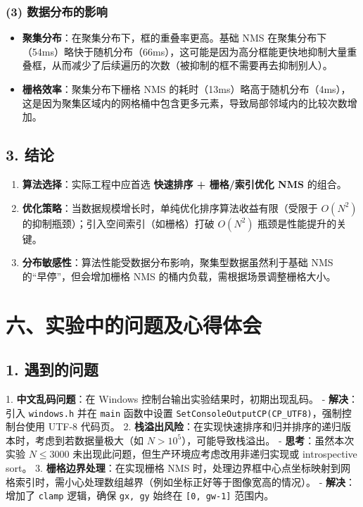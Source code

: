 \documentclass[a4paper,12pt]{ctexart}
\begin{document}
\subsubsection{(3) 数据分布的影响}
\begin{itemize}
    \item \textbf{聚集分布}：在聚集分布下，框的重叠率更高。基础 NMS 在聚集分布下（54ms）略快于随机分布（66ms），这可能是因为高分框能更快地抑制大量重叠框，从而减少了后续遍历的次数（被抑制的框不需要再去抑制别人）。
    \item \textbf{栅格效率}：聚集分布下栅格 NMS 的耗时（13ms）略高于随机分布（4ms），这是因为聚集区域内的网格桶中包含更多元素，导致局部邻域内的比较次数增加。
\end{itemize}

\subsection{3. 结论}
\begin{enumerate}
    \item \textbf{算法选择}：实际工程中应首选 \textbf{快速排序 + 栅格/索引优化 NMS} 的组合。
    \item \textbf{优化策略}：当数据规模增长时，单纯优化排序算法收益有限（受限于 $O(N^2)$ 的抑制瓶颈）；引入空间索引（如栅格）打破 $O(N^2)$ 瓶颈是性能提升的关键。
    \item \textbf{分布敏感性}：算法性能受数据分布影响，聚集型数据虽然利于基础 NMS 的“早停”，但会增加栅格 NMS 的桶内负载，需根据场景调整栅格大小。
\end{enumerate}

\section*{六、实验中的问题及心得体会}

\subsection{1. 遇到的问题}
1. \textbf{中文乱码问题}：在 Windows 控制台输出实验结果时，初期出现乱码。
   - \textbf{解决}：引入 \texttt{windows.h} 并在 \texttt{main} 函数中设置 \texttt{SetConsoleOutputCP(CP\_UTF8)}，强制控制台使用 UTF-8 代码页。
2. \textbf{栈溢出风险}：在实现快速排序和归并排序的递归版本时，考虑到若数据量极大（如 $N > 10^5$），可能导致栈溢出。
   - \textbf{思考}：虽然本次实验 $N \le 3000$ 未出现此问题，但生产环境应考虑改用非递归实现或 introspective sort。
3. \textbf{栅格边界处理}：在实现栅格 NMS 时，处理边界框中心点坐标映射到网格索引时，需小心处理数组越界（例如坐标正好等于图像宽高的情况）。
   - \textbf{解决}：增加了 \texttt{clamp} 逻辑，确保 \texttt{gx, gy} 始终在 \texttt{[0, gw-1]} 范围内。
\end{document}
